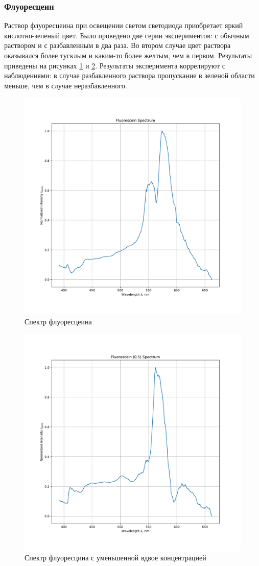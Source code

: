 \documentclass[a4paper, 12pt]{article}
\begin{document}
\subsubsection{Флуоресцеин}

Раствор флуоресцеина при освещении светом светодиода приобретает яркий кислотно-зеленый цвет. Было проведено две серии экспериментов: с обычным раствором и с разбавленным в два раза. Во втором случае цвет раствора оказывался более тусклым и каким-то более желтым, чем в первом. Результаты приведены на рисунках \ref{fig:fluorescein} и \ref{fig:fluorescein0.5}. Результаты эксперимента коррелируют с наблюдениями: в случае разбавленного раствора пропускание в зеленой области меньше, чем в случае неразбавленного.

\begin{figure}[H]
	\centering
	\includegraphics[width=0.7\linewidth]{c_yellow.pdf}
	\caption{Спектр флуоресцеина}
	\label{fig:fluorescein}
\end{figure}

\begin{figure}[H]
	\centering
	\includegraphics[width=0.7\linewidth]{c_lime.pdf}
	\caption{Спектр флуоресцина с уменьшенной вдвое концентрацией}
	\label{fig:fluorescein0.5}
\end{figure}
\end{document}
